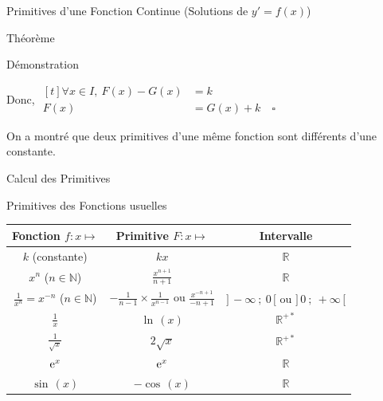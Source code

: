 \documentclass{coursbook}
\begin{document}
\begin{Gpartie}{Primitives d'une Fonction Continue \big(Solutions de $y'=f(x)$\big)}
\begin{Spartie}{Théorème}
\begin{SSpartie}{Démonstration}
\begin{enumerate}
                    Donc, 
                    $\begin{aligned}[t]
                        \forall x\in I,\ F(x)-G(x)&=k \\
                        F(x)&=G(x)+k\quad\square
                    \end{aligned}$
    
                    On a montré que deux primitives d'une même fonction sont différents d'une constante.
                \end{enumerate}
            \end{SSpartie}
        \end{Spartie}
    \end{Gpartie}
    \pagebreak
    \begin{Gpartie}{Calcul des Primitives} 
        \begin{Spartie}{Primitives des Fonctions usuelles} 
            \begin{table}[H] \centering {}
                \begin{tabular}[c]{ @{}*{3}{C}@{} } \toprule
                    Fonction $f:x\mapsto$                       & Primitive $F:x\mapsto$                                            & Intervalle  \\ \midrule
                    $k$ (constante)                             & $kx$                                                              & $\mathbb{R}$ \\ 
                    $x^n$ ($n\in\mathbb{N}$)                    & $\frac{x^{n+1}}{n+1}$                                             & $\mathbb{R}$ \\ 
                    $\frac{1}{x^n}=x^{-n}$ ($n\in\mathbb{N}$)   & $-\frac{1}{n-1}\times\frac{1}{x^{n-1}}$ ou $\frac{x^{-n+1}}{-n+1}$& $\big]\,-\infty~;~0\,\big[$ ou $\big]\,0~;~+\infty\,\big[$ \\ 
                    $\frac{1}{x}$                               & $\ln\,(x)$                                                          & $\mathbb{R^{+*}}$ \\ 
                    $\frac{1}{\sqrt{x}}$                        & $2\sqrt{x}$                                                       & $\mathbb{R^{+*}}$ \\ 
                    $\mathrm{e}^x$                                       & $\mathrm{e}^x$                                                             & $\mathbb{R}$ \\ 
                    $\sin\,(x)$                                   & $-\cos\,(x)$                                                        & $\mathbb{R}$ \\ 

\end{tabular}
\end{table}
\end{Spartie}
\end{Gpartie}
\end{document}
